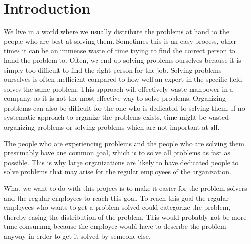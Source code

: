 \chapter{Introduction}
\label{sec:introduction}
\emptyTop{}%


We live in a world where we usually distribute the problems at hand to the people who are best at solving them.
Sometimes this is an easy process, other times it can be an immense waste of time trying to find the correct person to hand the problem to.
Often, we end up solving problems ourselves because it is simply too difficult to find the right person for the job.
Solving problems ourselves is often inefficient compared to how well an expert in the specific field solves the same problem.
This approach will effectively waste manpower in a company, as it is not the most effective way to solve problems.
Organizing problems can also be difficult for the one who is dedicated to solving them.
If no systematic approach to organize the problems exists, time might be wasted organizing problems or solving problems which are not important at all.

The people who are experiencing problems and the people who are solving them presumably have one common goal, which is to solve all problems as fast as possible.
This is why large organizations are likely to have dedicated people to solve problems that may arise for the regular employees of the organization.

What we want to do with this project is to make it easier for the problem solvers and the regular employees to reach this goal.
To reach this goal the regular employees who wants to get a problem solved could categorize the problem, thereby easing the distribution of the problem.
This would probably not be more time consuming because the employee would have to describe the problem anyway in order to get it solved by someone else.

